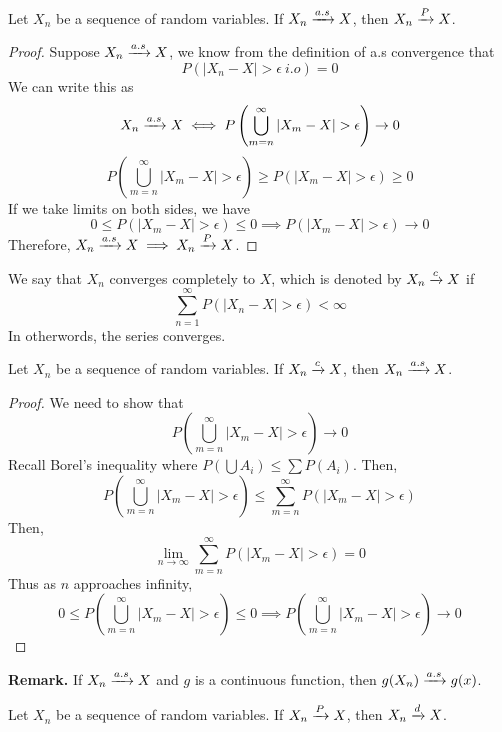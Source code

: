 \documentclass[openany]{report}
\begin{document}
\begin{theorem}
    Let $X_n$ be a sequence of random variables. If $X_n \xrightarrow{a.s} X$, then $X_n \xrightarrow{P} X$.
\end{theorem}
\begin{proof}
    Suppose $X_n \xrightarrow{a.s} X$, we know from the definition of a.s convergence that  
    \[P(|X_n - X| > \epsilon \ i.o) = 0\]
    We can write this as
    \[X_n \xrightarrow{a.s} X \iff P\left(\bigcup_{m=n}^\infty |X_m - X| > \epsilon\right) \rightarrow 0\]
    \[P\left(\bigcup_{m=n}^\infty |X_m - X| > \epsilon\right) \geq P(|X_m - X| > \epsilon) \geq 0\]
    If we take limits on both sides, we have 
    \[0 \leq P(|X_m - X| > \epsilon) \leq 0 \implies P(|X_m-X|>\epsilon) \rightarrow 0\]
    Therefore, $X_n \xrightarrow{a.s} X \implies X_n\xrightarrow{P} X$.     
\end{proof}
\begin{definition}
    We say that $X_n$ converges completely to $X$, which is denoted by $X_n \xrightarrow{c} X$ if 
    \[\sum_{n=1}^\infty P(|X_n -X| > \epsilon) < \infty\]
    In otherwords, the series converges. 
\end{definition}
\begin{theorem}
    Let $X_n$ be a sequence of random variables. If $X_n \xrightarrow{c} X$, then $X_n \xrightarrow{a.s} X$. 
\end{theorem}
\begin{proof}
    We need to show that 
    \[P\left(\bigcup_{m=n}^{\infty} |X_m - X| > \epsilon\right) \rightarrow 0\]
    Recall Borel's inequality where $P\left(\bigcup A_i\right) \leq \sum P(A_i)$. Then, 
    \[P\left(\bigcup_{m=n}^\infty |X_m - X| > \epsilon\right) \leq \sum_{m=n}^{\infty} P\left(|X_m - X| > \epsilon\right)\]
    Then, 
    \[\lim_{n\rightarrow \infty}\sum_{m=n}^{\infty} P\left(|X_m - X| > \epsilon\right) = 0\]
    Thus as $n$ approaches infinity, 
    \[0 \leq P\left(\bigcup_{m=n}^{\infty} |X_m - X| > \epsilon\right)\leq 0 \implies P\left(\bigcup_{m=n}^{\infty} |X_m - X| > \epsilon\right) \rightarrow 0\]
\end{proof}
\textbf{Remark.} If $X_n \xrightarrow{a.s} X$ and $g$ is a continuous function, then $g(X_n) \xrightarrow{a.s} g(x)$. 
\begin{theorem}
    Let $X_n$ be a sequence of random variables. If $X_n \xrightarrow{P} X$, then $X_n \xrightarrow{d} X$. 
\end{theorem}
\end{document}
